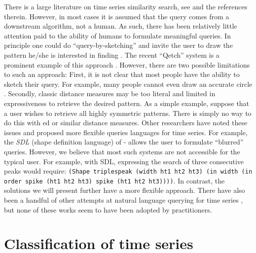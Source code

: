 There is a large literature on time series similarity search, see \cite{time_series} and the references therein. However, in most cases it is assumed that the query comes from a downstream algorithm, not a human. As such, there has been relatively little attention paid to the ability of humans to formulate meaningful queries. In principle one could do “query-by-sketching” and invite the user to draw the pattern he/she is interested in finding \cite{qetch, query_literature}. The recent “Qetch” system is a prominent example of this approach \cite{qetch}. However, there are two possible limitations to such an approach: First, it is not clear that most people have the ability to sketch their query. For example, many people cannot even draw an accurate circle \cite{draw_circle}. Secondly, classic distance measures may be too literal and limited in expressiveness to retrieve the desired pattern. As a simple example, suppose that a user wishes to retrieve all highly symmetric patterns. There is simply no way to do this with \gls{ed} or similar distance measures.
Other researchers have noted these issues and proposed more flexible queries languages for time series. For example, the \textit{SDL} (shape definition language) of \cite{text_query1}- allows the user to formulate “blurred” queries. However, we believe that most such systems are not accessible for the typical user. For example, with SDL, expressing the search of three consecutive peaks would require: 
\texttt{(Shape triplespeak (width ht1 ht2 ht3) (in width (in order spike (ht1 ht2 ht3) spike (ht1 ht2 ht3))))}. In contrast, the solutions we will present further have a more flexible approach. There have also been a handful of other attempts at natural language querying for time series \cite{puttinghuman, qute}, but none of these works seem to have been adopted by practitioners.

\section{Classification of time series}

